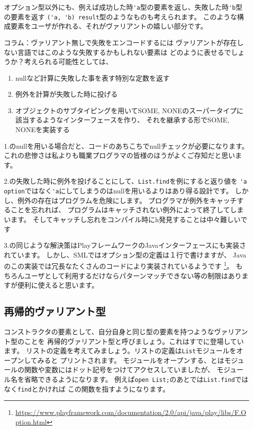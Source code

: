 \documentclass[11pt,a4paper]{article}
\begin{document}
オプション型以外にも、例えば成功した時\lstinline{'a}型の要素を返し、失敗した時\lstinline{'b}型の要素を返す
\lstinline{('a, 'b) result}型のようなものも考えられます。
このような構成要素をユーザが作れる、それがヴァリアントの嬉しい部分です。

\begin{itembox}[l]{コラム：ヴァリアント無しで失敗をエンコードするには}
ヴァリアントが存在しない言語ではこのような失敗するかもしれない要素は
どのように表せるでしょうか？考えられる可能性としては、
\begin{enumerate}
\item nullなど計算に失敗した事を表す特別な定数を返す
\item 例外を計算が失敗した時に投げる
\item オブジェクトのサブタイピングを用いてSOME, NONEのスーパータイプに該当するようなインターフェースを作り、
  それを継承する形でSOME, NONEを実装する
\end{enumerate}

1.のnullを用いる場合だと、コードのあちこちでnullチェックが必要になります。
これの悲惨さは私よりも職業プログラマの皆様のほうがよくご存知だと思います。

2.の失敗した時に例外を投げることにして、\lstinline{List.find}を例にすると返り値を
\lstinline{'a option}ではなく\lstinline{'a}にしてしまうのはnullを用いるよりはあり得る設計です。
しかし、例外の存在はプログラムを危険にします。
プログラマが例外をキャッチすることを忘れれば、
プログラムはキャッチされない例外によって終了してしまいます。
そしてキャッチし忘れをコンパイル時にh発見することは中々難しいです

3.の同じような解決策はPlayフレームワークのJavaインターフェースにも実装されています。
しかし、SMLではオプション型の定義は１行で書けますが、
Javaのこの実装では冗長なたくさんのコードにより実装されているようです
\footnote{\url{https://www.playframework.com/documentation/2.0/api/java/play/libs/F.Option.html}}。
もちろんユーザとして利用するだけならパターンマッチできない等の制限はありますが便利に使えると思います。
\end{itembox}

\subsection{再帰的ヴァリアント型}

コンストラクタの要素として、自分自身と同じ型の要素を持つようなヴァリアント型のことを
再帰的ヴァリアント型と呼びましょう。これはすでに登場しています。
リストの定義を考えてみましょう。リストの定義は\lstinline{List}モジュールをオープンしてみると
プリントされます。
モジュールをオープンする、とはモジュールの関数や変数にはドット記号をつけてアクセスしていましたが、
モジュール名を省略できるようになります。
例えば\lstinline{open List;}のあとでは\lstinline{List.find}ではなく\lstinline{find}とかければ
この関数を指すようになります。
\end{document}
